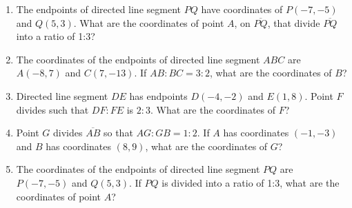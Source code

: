 \documentclass[12pt, twoside]{article}
\begin{document}
\begin{enumerate}
\item The endpoints of directed line segment $PQ$ have coordinates of
$P(-7,-5)$ and $Q(5,3)$. What are the coordinates of point $A$, on $\overline{PQ}$, that divide $\overline{PQ}$ into a ratio of 1:3?

\newpage
\item The coordinates of the endpoints of directed line segment $ABC$ are $A(-8,7)$ and $C(7,-13)$. If $AB:BC = 3:2$, what are the coordinates of $B$? \vspace{5cm}

\item Directed line segment $DE$ has endpoints $D(-4, -2)$ and $E(1,8)$.
Point $F$ divides such that $DF:FE$ is $2:3$. What are the coordinates
of $F$? \vspace{5cm}

\item Point $G$ divides $\overline{AB}$ so that $AG:GB = 1:2$. If $A$ has coordinates $(-1,-3)$ and $B$ has coordinates $(8,9)$, what are the coordinates of $G$? \vspace{5cm}

\item The coordinates of the endpoints of directed line segment $PQ$ are $P(-7,-5)$ and $Q(5,3)$. If $PQ$ is divided into a ratio of 1:3, what are the coordinates of point $A$? \vspace{5cm}


\end{enumerate}
\end{document}
